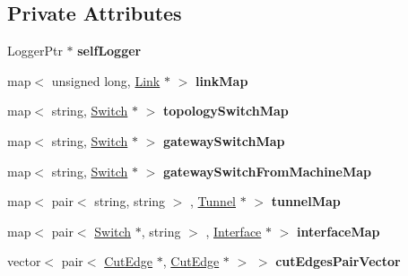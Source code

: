 \subsection*{\-Private \-Attributes}
\begin{DoxyCompactItemize}
\item 
\hypertarget{classDOT__Topology_ab341ddd84e79f775806e8d47bc9da5a2}{\-Logger\-Ptr $\ast$ {\bfseries self\-Logger}}\label{classDOT__Topology_ab341ddd84e79f775806e8d47bc9da5a2}

\item 
\hypertarget{classDOT__Topology_a4e09d71a3c7d7294ea65326a55ea9d02}{map$<$ unsigned long, \hyperlink{classLink}{\-Link} $\ast$ $>$ {\bfseries link\-Map}}\label{classDOT__Topology_a4e09d71a3c7d7294ea65326a55ea9d02}

\item 
\hypertarget{classDOT__Topology_a080a54232a323761329c4da798d93d89}{map$<$ string, \hyperlink{classSwitch}{\-Switch} $\ast$ $>$ {\bfseries topology\-Switch\-Map}}\label{classDOT__Topology_a080a54232a323761329c4da798d93d89}

\item 
\hypertarget{classDOT__Topology_ad2120b123976e579ae540fef20cd08bc}{map$<$ string, \hyperlink{classSwitch}{\-Switch} $\ast$ $>$ {\bfseries gateway\-Switch\-Map}}\label{classDOT__Topology_ad2120b123976e579ae540fef20cd08bc}

\item 
\hypertarget{classDOT__Topology_ada148b9369df546742e97b1ee643cc4b}{map$<$ string, \hyperlink{classSwitch}{\-Switch} $\ast$ $>$ {\bfseries gateway\-Switch\-From\-Machine\-Map}}\label{classDOT__Topology_ada148b9369df546742e97b1ee643cc4b}

\item 
\hypertarget{classDOT__Topology_ad4fbf81f63704cf8ba5b1b60161db635}{map$<$ pair$<$ string, string $>$\*
, \hyperlink{classTunnel}{\-Tunnel} $\ast$ $>$ {\bfseries tunnel\-Map}}\label{classDOT__Topology_ad4fbf81f63704cf8ba5b1b60161db635}

\item 
\hypertarget{classDOT__Topology_a780b552225afb67bf20e97fba404c89b}{map$<$ pair$<$ \hyperlink{classSwitch}{\-Switch} $\ast$, string $>$\*
, \hyperlink{classInterface}{\-Interface} $\ast$ $>$ {\bfseries interface\-Map}}\label{classDOT__Topology_a780b552225afb67bf20e97fba404c89b}

\item 
\hypertarget{classDOT__Topology_a74445c772a2a0447baa935ee50bd9934}{vector$<$ pair$<$ \hyperlink{classCutEdge}{\-Cut\-Edge} \*
$\ast$, \hyperlink{classCutEdge}{\-Cut\-Edge} $\ast$ $>$ $>$ {\bfseries cut\-Edges\-Pair\-Vector}}\label{classDOT__Topology_a74445c772a2a0447baa935ee50bd9934}


\end{DoxyCompactItemize}

